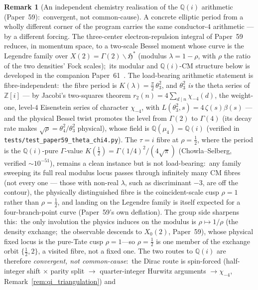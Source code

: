 \documentclass[11pt,a4paper]{article}
\theoremstyle{plain}
\theoremstyle{definition}
\newtheorem{remark}[theorem]{Remark}
\newcommand{\Q}{\mathbb{Q}}
\newcommand{\Z}{\mathbb{Z}}
\begin{document}
\begin{remark}[An independent chemistry realisation of the $\Q(i)$ arithmetic
(Paper~59):\ convergent, not common-cause]
\label{rem:paper59_cm}
A concrete elliptic period from a wholly different corner of the program carries
the same conductor-$4$ arithmetic --- by a different forcing.  The three-center
electron-repulsion integral of Paper~59~\cite{loutey_paper59} reduces, in
momentum space, to a two-scale Bessel moment whose curve is the Legendre family
over $X(2)=\Gamma(2)\backslash\mathfrak{H}^{\ast}$ (modulus $\lambda = 1-\rho$,
with $\rho$ the ratio of the two densities' Fock scales);\ its modular and
$\Q(i)$-CM structure below is developed in the companion
Paper~61~\cite{loutey_paper61}.  The load-bearing
arithmetic statement is fibre-independent:\ the fibre period is
$K(\lambda)=\tfrac{\pi}{2}\,\theta_{3}^{2}$, and $\theta_{3}^{2}$ \emph{is} the
theta series of $\Z[i]$ --- by Jacobi's two-squares theorem
$r_{2}(n)=4\sum_{d\mid n}\chi_{-4}(d)$, the weight-one, level-$4$ Eisenstein
series of character $\chi_{-4}$, with $L(\theta_{3}^{2},s)=4\,\zeta(s)\beta(s)$
--- and the physical Bessel twist promotes the level from $\Gamma(2)$ to
$\Gamma(4)$ (its decay rate makes
$\sqrt{\rho}=\theta_{4}^{2}/\theta_{3}^{2}$ physical), whose field is
$\Q(\mu_4)=\Q(i)$ (verified in
\texttt{tests/test\_paper59\_theta\_chi4.py}).  The $\tau=i$ fibre at
$\rho=\tfrac12$, where the period is the $\Q(i)$-pure $\Gamma$-value
$K(\tfrac12)=\Gamma(1/4)^{2}/(4\sqrt\pi)$ (Chowla--Selberg, verified
$\sim\!10^{-51}$), remains a clean instance but is not load-bearing:\ any family
sweeping its full real modulus locus passes through infinitely many CM
fibres (not every one --- those with non-real $\lambda$, such as discriminant
$-3$, are off the contour), the
physically distinguished fibre is the coincident-scale cusp $\rho=1$ rather than
$\rho=\tfrac12$, and landing on the Legendre family is itself expected for a
four-branch-point curve (Paper~59's own deflation).  The group side sharpens
this:\ the only involution the physics induces on the modulus is
$\rho\mapsto1/\rho$ (the density exchange;\ the observable descends to
$X_0(2)$, Paper~59), whose physical fixed locus is the pure-Tate cusp
$\rho=1$---so $\rho=\tfrac12$ is one member of the exchange orbit
$\{\tfrac12,2\}$, a visited fibre, not a fixed one.  The two routes to $\Q(i)$
are therefore \emph{convergent, not common-cause}:\ the Dirac route is
spin-forced (half-integer shift $\times$ parity split $\to$ quarter-integer
Hurwitz arguments $\to \chi_{-4}$, Remark~\ref{rem:qi_triangulation}) and

\end{remark}
\end{document}
